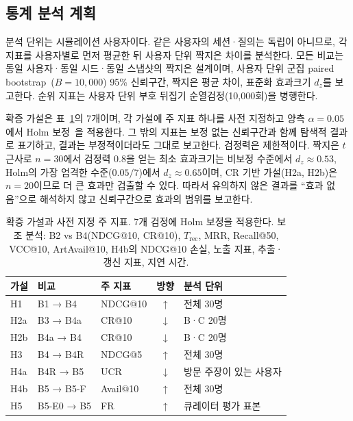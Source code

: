 \documentclass[10pt,twocolumn,letterpaper]{article}
\begin{document}
\subsection{통계 분석 계획}
\label{sec:stats}
분석 단위는 시뮬레이션 사용자이다. 같은 사용자의 세션·질의는 독립이 아니므로, 각 지표를 사용자별로 먼저 평균한 뒤 사용자 단위 짝지은 차이를 분석한다. 모든 비교는 동일 사용자·동일 시드·동일 스냅샷의 짝지은 설계이며, 사용자 단위 군집 paired bootstrap~\cite{efron1993bootstrap}($B=10{,}000$) 95\% 신뢰구간, 짝지은 평균 차이, 표준화 효과크기 $d_z$를 보고한다. 순위 지표는 사용자 단위 부호 뒤집기 순열검정(10,000회)을 병행한다.

확증 가설은 표~\ref{tab:hyp}의 7개이며, 각 가설에 주 지표 하나를 사전 지정하고 양측 $\alpha=0.05$에서 Holm 보정~\cite{holm1979}을 적용한다. 그 밖의 지표는 보정 없는 신뢰구간과 함께 탐색적 결과로 표기하고, 결과는 부정적이더라도 그대로 보고한다. 검정력은 제한적이다. 짝지은 $t$ 근사로 $n=30$에서 검정력 0.8을 얻는 최소 효과크기는 비보정 수준에서 $d_z\approx0.53$, Holm의 가장 엄격한 수준($0.05/7$)에서 $d_z\approx0.65$이며, CR 기반 가설(H2a, H2b)은 $n=20$이므로 더 큰 효과만 검출할 수 있다. 따라서 유의하지 않은 결과를 ``효과 없음''으로 해석하지 않고 신뢰구간으로 효과의 범위를 보고한다.

\begin{table}[t]
\centering\small
\setlength{\tabcolsep}{3.2pt}
\begin{tabularx}{\columnwidth}{@{}l>{\raggedright\arraybackslash}p{1.55cm}>{\raggedright\arraybackslash}p{1.7cm}c>{\raggedright\arraybackslash}X@{}}
\toprule
가설 & 비교 & 주 지표 & 방향 & 분석 단위 \\
\midrule
H1 & B1 → B4 & NDCG@10 & ↑ & 전체 30명 \\
H2a & B3 → B4a & CR@10 & ↓ & B·C 20명 \\
H2b & B4a → B4 & CR@10 & ↓ & B·C 20명 \\
H3 & B4 → B4R & NDCG@5 & ↑ & 전체 30명 \\
H4a & B4R → B5 & UCR & ↓ & 방문 주장이 있는 사용자 \\
H4b & B5 → B5-F & Avail@10 & ↑ & 전체 30명 \\
H5 & B5-E0 → B5 & FR & ↑ & 큐레이터 평가 표본 \\
\bottomrule
\end{tabularx}
\caption{확증 가설과 사전 지정 주 지표. 7개 검정에 Holm 보정을 적용한다. 보조 분석: B2 vs B4(NDCG@10, CR@10), $T_{\mathrm{rec}}$, MRR, Recall@50, VCC@10, ArtAvail@10, H4b의 NDCG@10 손실, 노출 지표, 추출·갱신 지표, 지연 시간.}
\label{tab:hyp}
\end{table}
\end{document}
